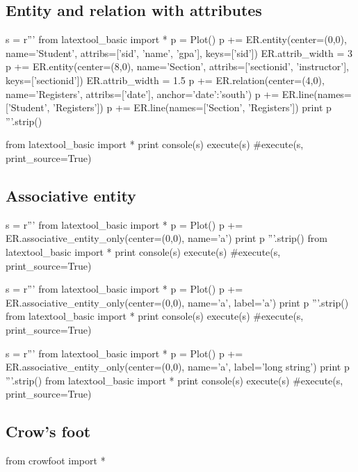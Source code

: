 \newpage
\subsection{Entity and relation with attributes}
\begin{python}
s = r'''
from latextool_basic import *
p = Plot()
p += ER.entity(center=(0,0),
               name='Student',
               attribs=['sid', 'name', 'gpa'], keys=['sid'])
ER.attrib_width = 3
p += ER.entity(center=(8,0),
               name='Section',
               attribs=['sectionid', 'instructor'], keys=['sectionid'])
ER.attrib_width = 1.5
p += ER.relation(center=(4,0), name='Registers',
                 attribs=['date'],
                 anchor={'date':'south'})
p += ER.line(names=['Student', 'Registers'])
p += ER.line(names=['Section', 'Registers'])
print p
'''.strip()

from latextool_basic import *
print console(s)
execute(s)
#execute(s, print_source=True)
\end{python}


\newpage
\subsection{Associative entity}
\begin{python}
s = r'''
from latextool_basic import *
p = Plot()
p += ER.associative_entity_only(center=(0,0), name='a')
print p
'''.strip()
from latextool_basic import *
print console(s)
execute(s)
#execute(s, print_source=True)
\end{python}

\begin{python}
s = r'''
from latextool_basic import *
p = Plot()
p += ER.associative_entity_only(center=(0,0), name='a', label='a')
print p
'''.strip()
from latextool_basic import *
print console(s)
execute(s)
#execute(s, print_source=True)
\end{python}

\begin{python}
s = r'''
from latextool_basic import *
p = Plot()
p += ER.associative_entity_only(center=(0,0), name='a', label='long string')
print p
'''.strip()
from latextool_basic import *
print console(s)
execute(s)
#execute(s, print_source=True)
\end{python}



\newpage
\subsection{Crow's foot}


\begin{python}
from crowfoot import *
\end{python}
